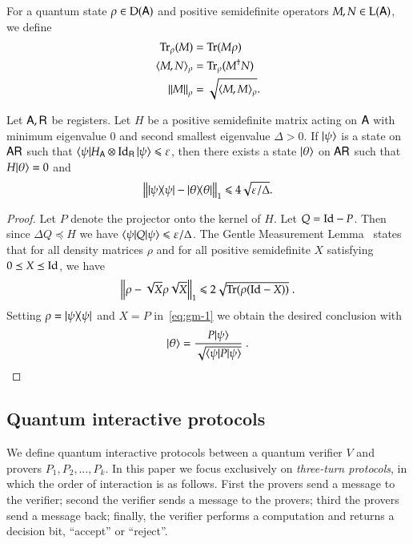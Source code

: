 For a quantum state $\rho \in \mathrm{D}({\mathsf{A}})$ and positive semidefinite operators $M,N \in \mathrm{L}({\mathsf{A}})$, we define 
\begin{align}
	\operatorname{Tr}_\rho(M) &= \operatorname{Tr}(M \rho) \\
	\langle M, N \rangle_\rho &= \operatorname{Tr}_\rho (M^\dagger N) \\
	\left\lVert M \right\rVert_\rho & = \sqrt{ \langle M, M \rangle_\rho}.
\end{align}

\begin{lemma}
\label{lem:closeness_to_groundspace}
	Let ${\mathsf{A}}, {\mathsf{R}}$ be registers. Let $H$ be a positive semidefinite matrix acting on ${\mathsf{A}}$ with minimum eigenvalue $0$ and second smallest eigenvalue $\Delta > 0$. If $|\psi\rangle$ is a state on ${\mathsf{A}} {\mathsf{R}}$ such that $\langle\psi| H_{{\mathsf{A}}} \otimes \mathop{\mathrm{Id}}\!\mathinner{}_{{\mathsf{R}}} |\psi\rangle \leqslant \varepsilon$, then there exists a state $|\theta\rangle$ on ${\mathsf{A}} {\mathsf{R}}$ such that $H |\theta\rangle = 0$ and
	\[
		\left \| |\psi\rangle\! \langle \psi| - |\theta\rangle\! \langle \theta| \right \|_1 \leqslant 4\sqrt{\varepsilon/\Delta}.
	\]
\end{lemma}
\begin{proof}
	Let $P$ denote the projector onto the kernel of $H$. Let $Q = \mathop{\mathrm{Id}}\!\mathinner{} - P$. Then since $\Delta Q \preceq H$ we have $\langle\psi| Q |\psi\rangle \leqslant \varepsilon/\Delta$. The Gentle Measurement Lemma~\cite{ogawa2002new} states that for all density matrices $\rho$ and for all positive semidefinite $X$ satisfying $0 \preceq X \preceq \mathop{\mathrm{Id}}\!\mathinner{}$, we have
	\begin{equation}\label{eq:gm-1}
		\left \| \rho - \sqrt{X}\rho \sqrt{X}  \right \|_1 \leq 2 \sqrt{ \Tr(\rho (\Id - X))}\;.
	\end{equation}
	Setting $\rho = |\psi\rangle\! \langle \psi|$ and $X = P$ in~\eqref{eq:gm-1} we obtain the desired conclusion with
	\[
		|\theta\rangle = \frac{ P |\psi\rangle}{\sqrt{ \langle\psi| P |\psi\rangle}}\;.
	\]
\end{proof}

\subsection{Quantum interactive protocols} 

We define quantum interactive protocols between a quantum verifier $V$ and provers $P_1,P_2,\ldots,P_k$. In this paper we focus exclusively on \emph{three-turn protocols}, in which the order of interaction is as follows. First the provers send a message to the verifier; second the verifier sends a message to the provers; third the provers send a message back; finally, the verifier performs a computation and returns a decision bit,  ``accept'' or ``reject''. 



